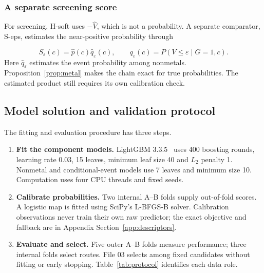 \subsubsection{A separate screening score}
For screening, H-soft uses $-\widehat V$, which is not a probability. A separate comparator, S-eps, estimates the near-positive probability through
\begin{samepage}
\begin{equation}
 S_{\varepsilon}(c)=\widehat p(c)\widehat q_{\varepsilon}(c),
 \qquad q_{\varepsilon}(c)=P(V\le\varepsilon\mid G=1,c).
 \label{eq:chain}
\end{equation}
\noindent Here $\widehat q_{\varepsilon}$ estimates the event probability among nonmetals. Proposition~\ref{prop:metal} makes the chain exact for true probabilities. The estimated product still requires its own calibration check.
\end{samepage}

\subsection{Model solution and validation protocol}
The fitting and evaluation procedure has three steps.
\begin{enumerate}
  \item \textbf{Fit the component models.} LightGBM 3.3.5~\cite{ke2017} uses 400 boosting rounds, learning rate 0.03, 15 leaves, minimum leaf size 40 and $L_2$ penalty 1. Nonmetal and conditional-event models use 7 leaves and minimum size 10. Computation uses four CPU threads and fixed seeds.
  \item \textbf{Calibrate probabilities.} Two internal A--B folds supply out-of-fold scores. A logistic map is fitted using SciPy's L-BFGS-B solver. Calibration observations never train their own raw predictor; the exact objective and fallback are in Appendix Section~\ref{app:descriptors}.
  \item \textbf{Evaluate and select.} Five outer A--B folds measure performance; three internal folds select routes. File 03 selects among fixed candidates without fitting or early stopping. Table~\ref{tab:protocol} identifies each data role.
\end{enumerate}

